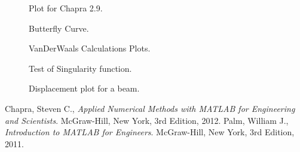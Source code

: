 \documentclass{article}
\begin{document}
\begin{figure}[ht!]
\begin{center}
\caption{Plot for Chapra 2.9.\label{ChargeGraph}}
\end{center}
\end{figure}

\begin{figure}[ht!]
\begin{center}
\caption{Butterfly Curve.\label{ButterflyGraph}}
\end{center}
\end{figure}

\begin{figure}[ht!]
\begin{center}
\caption{VanDerWaals Calculations Plots.\label{PressureGraph}}
\end{center}
\end{figure}

\begin{figure}[ht!]
\begin{center}
\caption{Test of Singularity function.}
\end{center}
\end{figure}

\begin{figure}[ht!]
\begin{center}
\caption{Displacement plot for a beam.}
\end{center}
\end{figure}
\clearpage

\begin{thebibliography}{9}
  Chapra, Steven C.,
  {\it Applied Numerical Methods with MATLAB for Engineering and Scientists}.
  McGraw-Hill, New York,
  3rd Edition,
  2012.
  Palm, William J.,
  {\it Introduction to MATLAB for Engineers}.
  McGraw-Hill, New York,
  3rd Edition,
  2011.
\end{thebibliography}
\end{document}
